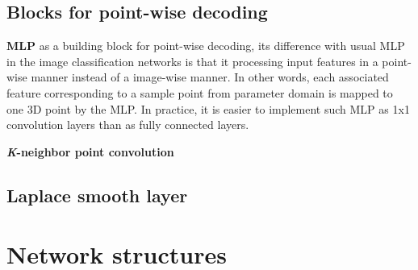 \subsection{Blocks for point-wise decoding}

\noindent\textbf{MLP} as a building block for point-wise decoding, its difference with usual MLP in the image classification networks is that it processing input features in a point-wise manner instead of a image-wise manner. In other words, each associated feature corresponding to a sample point from parameter domain is mapped to one 3D point by the MLP. In practice, it is easier to implement such MLP as 1x1 convolution layers than as fully connected layers.

\noindent\textbf{\emph{K}-neighbor point convolution}

\subsection{Laplace smooth layer}

\section{Network structures}
